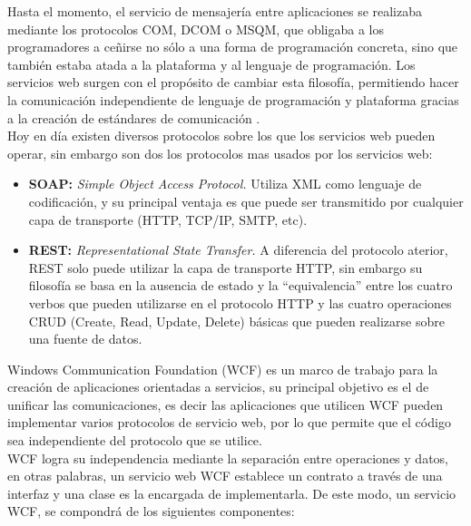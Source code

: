 
Hasta el momento, el servicio de mensajería entre aplicaciones se realizaba mediante los protocolos COM, DCOM o MSQM, que obligaba a los programadores a ceñirse no sólo a una forma de programación concreta, sino que también estaba atada a la plataforma y al lenguaje de programación. Los servicios web surgen con el propósito de cambiar esta filosofía, permitiendo hacer la comunicación independiente de lenguaje de programación y plataforma gracias a la creación de estándares de comunicación \cite{WCF15}.
\\

Hoy en día  existen diversos protocolos sobre los que los servicios web pueden operar, sin embargo  son dos los protocolos mas usados por los servicios web:
\begin{itemize}
	\item \textbf{SOAP:} \textit{Simple Object Access Protocol.} Utiliza XML como lenguaje de codificación, y su principal ventaja es que puede ser transmitido por cualquier capa de transporte (HTTP, TCP/IP, SMTP, etc).

	
	\item \textbf{REST:} \textit{Representational State Transfer.} A diferencia del protocolo  aterior, REST solo puede utilizar la capa de transporte HTTP, sin embargo su filosofía se  basa en la ausencia de estado y la “equivalencia” entre los cuatro verbos que pueden utilizarse en el protocolo HTTP y las cuatro operaciones CRUD (Create, Read, Update, Delete) básicas que pueden realizarse sobre una fuente de datos. 
\end{itemize}



 
Windows Communication Foundation (WCF)  es un marco de trabajo para la creación de aplicaciones orientadas a servicios, su principal objetivo  es el de unificar las comunicaciones, es decir las aplicaciones que utilicen WCF pueden  implementar varios protocolos de servicio web, por lo que permite que el código sea independiente del protocolo que se utilice.
\\

WCF logra su independencia mediante la separación entre operaciones y datos, en otras palabras, un servicio web WCF establece un contrato a través de una interfaz y una clase es la encargada de implementarla. De este modo, un servicio WCF, se compondrá de los siguientes componentes:

